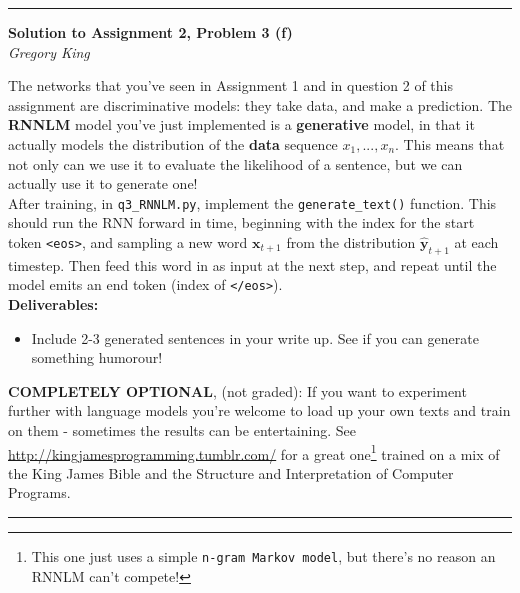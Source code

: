 \documentclass[letter,12pt]{article}
\newcommand{\myhwtitle}[3]
{\begin{center}
{\large {\bf Solution to Assignment {#1}, Problem {#2}}}\\
\medskip 
{\it {#3}} %
\end{center}}
\newcommand{\solutionsAuthor}{Gregory King}
\begin{document}
\vspace{5mm}
\noindent\rule{\textwidth}{0.4pt}

\clearpage

\myhwtitle{2}{3 (f)}{\solutionsAuthor}

\bigskip

\noindent The networks that you've seen in Assignment 1 and in question 2 of this assignment are discriminative models: they take data, and make a prediction. The \textbf{RNNLM} model you've just implemented is a \textbf{generative} model, in that it actually models the distribution of the \textbf{data} sequence $x_{1}, ...,x_{n}$. This means that not only can we use it to evaluate the likelihood of a sentence, but we can actually use it to generate one! \\

\noindent After training, in \texttt{q3\_RNNLM.py}, implement the \texttt{generate\_text()} function. This should run the RNN forward in time, beginning with the index for the start token \texttt{<eos>}, and sampling a new word ${\boldsymbol x}_{t+1}$ from the distribution ${\hat{\boldsymbol y}}_{t+1}$ at each timestep. Then feed this word in as input at the next step, and repeat until the model emits an end token (index of \texttt{</eos>}).\\

{\Large \textbf{Deliverables:}}
\begin{itemize}
\item{Include 2-3 generated sentences in your write up. See if you can generate something humorour!}
\end{itemize}

\noindent\textbf{COMPLETELY OPTIONAL}, (not graded): If you want to experiment further with language models you're welcome to load up your own texts and train on them - sometimes the results can be entertaining. See \url{http://kingjamesprogramming.tumblr.com/} for a great one\footnote{This one just uses a simple \texttt{n-gram Markov model}, but there's no reason an RNNLM can't compete!} trained on a mix of the King James Bible and the Structure and Interpretation of Computer Programs.

\vspace{5mm}
\noindent\rule{\textwidth}{0.4pt}

\clearpage
\end{document}
